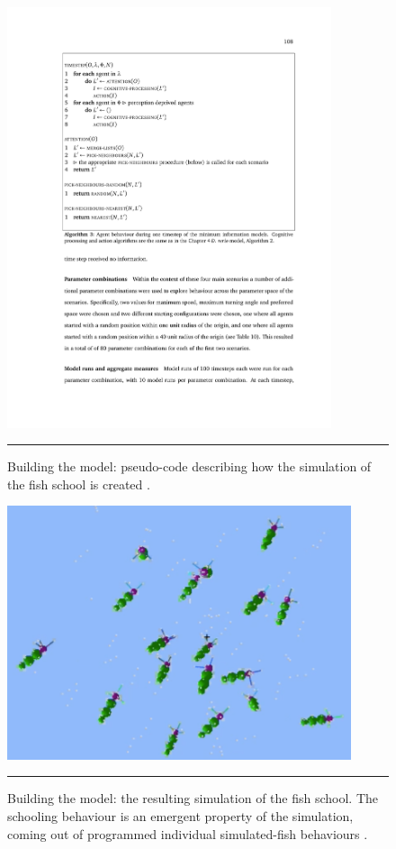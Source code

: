 \begin{figure}[!t]
	\centering
		\includegraphics[width=0.85\textwidth]{images/SIM/implementation.pdf}
	\caption[\small Fish school simulation pseudo-code]{\small Building the model: pseudo-code describing how the simulation of the fish school is created \cite{SIM_S}.}
	\label{simfig:8}\hrule
\end{figure}

\begin{figure}[!t]
	\centering
		\includegraphics[width=0.9\textwidth]{images/SIM/simulatedfish3.png}
	\caption[\small A screen shot of the 3D fish school simulation]{\small Building the model: the resulting simulation of the fish school. The schooling behaviour is an emergent property of the simulation, coming out of programmed individual simulated-fish behaviours \cite{SIM_S}.}
	\label{simfig:9}\hrule
\end{figure}

